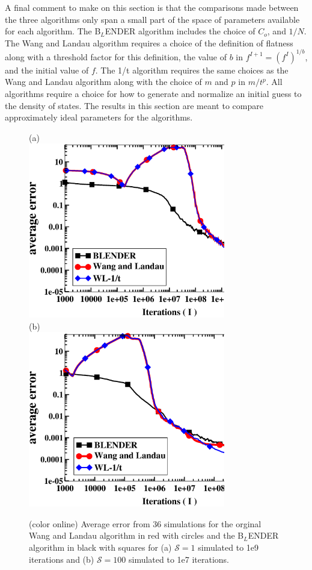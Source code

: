 \documentclass[aps,pre,reprint,superscriptaddress,showkeys]{revtex4-2}
\begin{document}
  A final comment to make on this section is that the comparisons made between the three algorithms only span a small part of the space of parameters available for each algorithm.  The B$_L$ENDER algorithm includes the choice of $C_o$, and $1/N$. The Wang and Landau algorithm requires a choice of the definition of flatness along with a threshold factor for this definition, the value of $b$ in $f^{I+1}= (f^I)^{1/b}$, and  the initial value of $f$. The 1/t algorithm requires the same choices as the Wang and Landau algorithm along with the choice of $m$ and $p$ in $m/t^p$. All algorithms require a choice for how to generate and normalize an initial guess to the density of states.  The results in this section are meant to compare approximately ideal parameters for the algorithms. 
\begin{figure}[h!]
(a)\\
\includegraphics[width=8.6cm]{fig4a.eps}\\
(b)\\
\includegraphics[width=8.6cm]{fig4b.eps}\\
\caption{(color online) Average error from 36 simulations for the orginal Wang and Landau algorithm in red with circles and the B$_L$ENDER  algorithm in black with squares for (a) $\mathcal{S}=1$ simulated to 1e9 iterations and (b) $\mathcal{S}=100$ simulated to 1e7 iterations. \label{compare_blender_wl}}
\end{figure}
\end{document}
